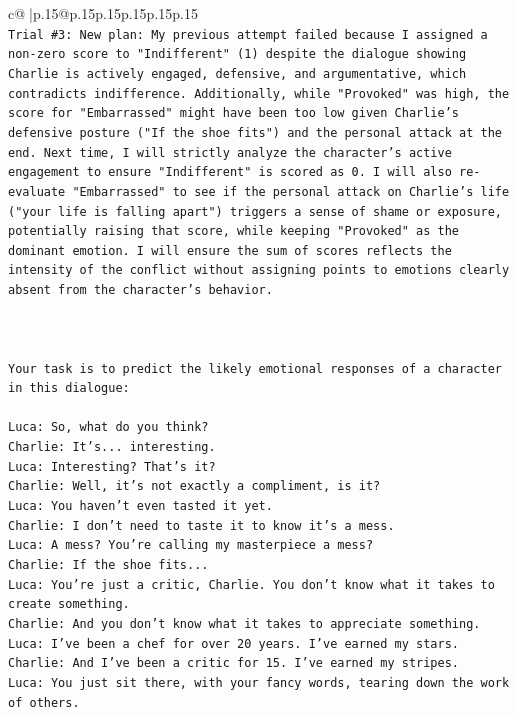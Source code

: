 \documentclass{article}
\begin{document}
{\begin{supertabular}{c@{$\;$}|p{.15\linewidth}@{}p{.15\linewidth}p{.15\linewidth}p{.15\linewidth}p{.15\linewidth}p{.15\linewidth}}
{{{\\ 
\texttt{Trial \#3: New plan: My previous attempt failed because I assigned a non{-}zero score to "Indifferent" (1) despite the dialogue showing Charlie is actively engaged, defensive, and argumentative, which contradicts indifference. Additionally, while "Provoked" was high, the score for "Embarrassed" might have been too low given Charlie's defensive posture ("If the shoe fits") and the personal attack at the end. Next time, I will strictly analyze the character's active engagement to ensure "Indifferent" is scored as 0. I will also re{-}evaluate "Embarrassed" to see if the personal attack on Charlie's life ("your life is falling apart") triggers a sense of shame or exposure, potentially raising that score, while keeping "Provoked" as the dominant emotion. I will ensure the sum of scores reflects the intensity of the conflict without assigning points to emotions clearly absent from the character's behavior.} \\
\\ 
\\ 
\\ 
\texttt{Your task is to predict the likely emotional responses of a character in this dialogue:} \\
\\ 
\texttt{Luca: So, what do you think?} \\
\texttt{Charlie: It's... interesting.} \\
\texttt{Luca: Interesting? That's it?} \\
\texttt{Charlie: Well, it's not exactly a compliment, is it?} \\
\texttt{Luca: You haven't even tasted it yet. } \\
\texttt{Charlie: I don't need to taste it to know it's a mess.} \\
\texttt{Luca: A mess? You're calling my masterpiece a mess?} \\
\texttt{Charlie: If the shoe fits...} \\
\texttt{Luca: You're just a critic, Charlie. You don't know what it takes to create something.} \\
\texttt{Charlie: And you don't know what it takes to appreciate something. } \\
\texttt{Luca: I've been a chef for over 20 years. I've earned my stars.} \\
\texttt{Charlie: And I've been a critic for 15. I've earned my stripes.} \\
\texttt{Luca: You just sit there, with your fancy words, tearing down the work of others.} \\
}}}
\end{supertabular}}
\end{document}
